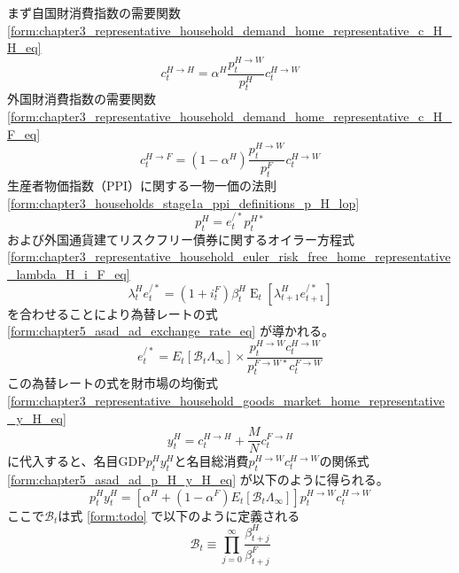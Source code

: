 まず自国財消費指数の需要関数
\eqref{form:chapter3_representative_household_demand_home_representative_c_H_H_eq}
\begin{equation}
\label{form:chapter5_asad_ad_c_H_H_eq}
    c_t^{H\to H}=\alpha^H\frac{p_t^{H\to W}}{p_t^H}c_t^{H\to W}
\end{equation}
外国財消費指数の需要関数
\eqref{form:chapter3_representative_household_demand_home_representative_c_H_F_eq}
\begin{equation}
\label{form:chapter5_asad_ad_c_H_F_eq}
    c_t^{H\to F}=(1-\alpha^H)\frac{p_t^{H\to W}}{p_t^F}c_t^{H\to W}
\end{equation}
生産者物価指数（PPI）に関する一物一価の法則
\eqref{form:chapter3_households_stage1a_ppi_definitions_p_H_lop}
\begin{equation}
\label{form:chapter5_asad_ad_lop_eq}
    p_t^H=e_t^{/*}p_t^{H*}
\end{equation}
および外国通貨建てリスクフリー債券に関するオイラー方程式
\eqref{form:chapter3_representative_household_euler_risk_free_home_representative_lambda_H_i_F_eq}
\begin{equation}
\label{form:chapter5_asad_ad_lambda_H_i_F_eq}
    \lambda_t^He_t^{/*}=(1+i_t^F)\beta_t^H\operatorname{E}_t[\lambda_{t+1}^He_{t+1}^{/*}]
\end{equation}
を合わせることにより為替レートの式
\eqref{form:chapter5_asad_ad_exchange_rate_eq}
が導かれる。
\begin{equation}
\label{form:chapter5_asad_ad_e_slash_asterisk_eq}
    e_t^{/*}=E_t[\mathcal{B}_t\Lambda_{\infty}]\times\frac{p_t^{H\to W}c_t^{H\to W}}{p_t^{F\to W*}c_t^{F\to W}}
\end{equation}
この為替レートの式を財市場の均衡式
\eqref{form:chapter3_representative_household_goods_market_home_representative_y_H_eq}
\begin{equation}
\label{form:chapter5_asad_ad_y_H_eq}
    y_t^H=c_t^{H\to H}+\frac{M}{N}c_t^{F\to H}
\end{equation}
に代入すると、名目GDP\(p_t^Hy_t^H\)と名目総消費\(p_t^{H\to W}c_t^{H\to W}\)の関係式
\eqref{form:chapter5_asad_ad_p_H_y_H_eq}
が以下のように得られる。
\begin{equation}
\label{form:chapter5_asad_ad_p_H_y_H_eq}
p_t^Hy_t^H=\left[\alpha^H+(1-\alpha^F)E_t[\mathcal{B}_t\Lambda_{\infty}]\right]p_t^{H\to W}c_t^{H\to W}
\end{equation}
ここで\(\mathcal{B}_t\)は式
\eqref{form:todo}
で以下のように定義される
\begin{equation}
\label{form:chapter5_asad_ad_B_t_def}
    \mathcal{B}_t\equiv\prod_{j=0}^{\infty}\frac{\beta_{t+j}^H}{\beta_{t+j}^F}
\end{equation}
